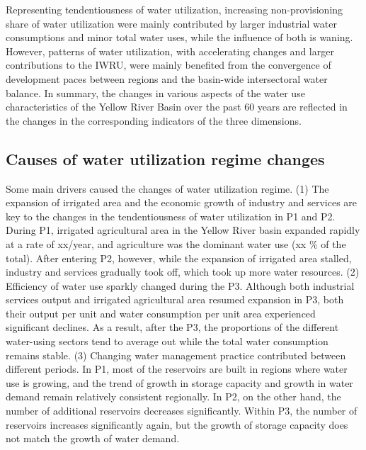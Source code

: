 \documentclass[9pt, twocolumn, twoside, lineno]{pnas-new}
\begin{document}
Representing tendentiousness of water utilization, 
increasing non-provisioning share of water utilization were mainly contributed by larger industrial water consumptions and minor total water uses, 
while the influence of both is waning.
However, patterns of water utilization, with accelerating changes and larger contributions to the IWRU, 
were mainly benefited from the convergence of development paces between regions and the basin-wide intersectoral water balance.
In summary, the changes in various aspects of the water use characteristics of the Yellow River Basin over the past 60 years 
are reflected in the changes in the corresponding indicators of the three dimensions.

\subsection*{Causes of water utilization regime changes}
Some main drivers caused the changes of water utilization regime.
(1) The expansion of irrigated area and the economic growth of industry and services are key to the
changes in the tendentiousness of water utilization in P1 and P2.
During P1, irrigated agricultural area in the Yellow River basin expanded rapidly at a rate of xx/year, 
and agriculture was the dominant water use (xx \% of the total).
After entering P2, however, while the expansion of irrigated area stalled, 
industry and services gradually took off, which took up more water resources.
(2) Efficiency of water use sparkly changed during the P3.
Although both industrial services output and irrigated agricultural area resumed expansion in P3, 
both their output per unit and water consumption per unit area experienced significant declines.
As a result, after the P3, the proportions of the different water-using sectors tend to average out 
while the total water consumption remains stable.
(3) Changing water management practice contributed between different periods.
In P1, most of the reservoirs are built in regions where water use is growing, 
and the trend of growth in storage capacity and growth in water demand remain relatively consistent regionally.
In P2, on the other hand, the number of additional reservoirs decreases significantly. 
Within P3, the number of reservoirs increases significantly again, 
but the growth of storage capacity does not match the growth of water demand.

\end{document}
